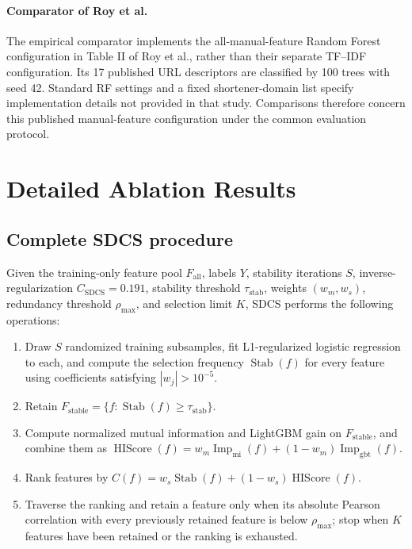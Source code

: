 \documentclass[10pt]{article}
\newcommand{\blue}[1]{{\color{black}#1}}
\begin{document}
\paragraph{Comparator of Roy et al.} \blue{The empirical comparator implements the all-manual-feature Random Forest configuration in Table II of Roy et al., rather than their separate TF--IDF configuration. Its 17 published URL descriptors are classified by 100 trees with seed 42. Standard RF settings and a fixed shortener-domain list specify implementation details not provided in that study. Comparisons therefore concern this published manual-feature configuration under the common evaluation protocol.}

\section{Detailed Ablation Results}

\subsection{Complete SDCS procedure}

Given the training-only feature pool $F_{\mathrm{all}}$, labels $Y$, stability iterations $S$, inverse-regularization $C_{\mathrm{SDCS}}=0.191$, stability threshold $\tau_{\mathrm{stab}}$, weights $(w_m,w_s)$, redundancy threshold $\rho_{\max}$, and selection limit $K$, SDCS performs the following operations:
\begin{enumerate}
\item Draw $S$ randomized training subsamples, fit L1-regularized logistic regression to each, and compute the selection frequency $\operatorname{Stab}(f)$ for every feature using coefficients satisfying $|w_j|>10^{-5}$.
\item Retain $F_{\mathrm{stable}}=\{f:\operatorname{Stab}(f)\geq\tau_{\mathrm{stab}}\}$.
\item Compute normalized mutual information and \blue{LightGBM gain} on $F_{\mathrm{stable}}$, and combine them as $\operatorname{HIScore}(f)=w_m\operatorname{Imp}_{\mathrm{mi}}(f)+(1-w_m)\operatorname{Imp}_{\mathrm{gbt}}(f)$.
\item Rank features by $C(f)=w_s\operatorname{Stab}(f)+(1-w_s)\operatorname{HIScore}(f)$.
\item Traverse the ranking and retain a feature only when its absolute Pearson correlation with every previously retained feature is below $\rho_{\max}$; stop when $K$ features have been retained or the ranking is exhausted.
\end{enumerate}
\end{document}
